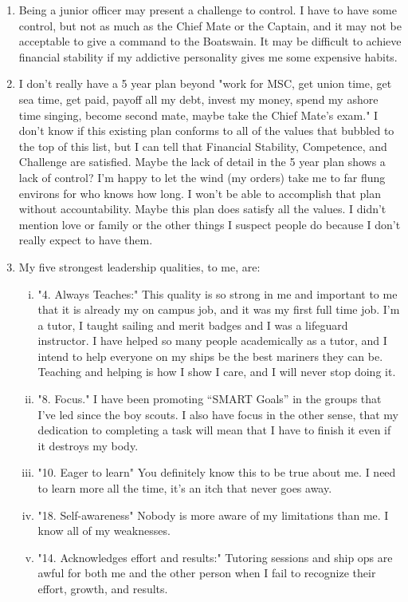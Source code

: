 \documentclass{article}[letterpaper,12pt]
\begin{document}
\begin{enumerate}
	\item Being a junior officer may present a challenge to control.
	I have to have some control, but not as much as the Chief Mate or the Captain, and it may not be acceptable to give a command to the Boatswain. It may be difficult to achieve financial stability if my addictive personality gives me some expensive habits. 
	\item I don't really have a 5 year plan beyond "work for MSC, get union time, get sea time, get paid, payoff all my debt, invest my money, spend my ashore time singing, become second mate, maybe take the Chief Mate's exam." I don't know if this existing plan conforms to all of the values that bubbled to the top of this list, but I can tell that Financial Stability, Competence, and Challenge are satisfied. Maybe the lack of detail in the 5 year plan shows a lack of control? I'm happy to let the wind (my orders) take me to far flung environs for who knows how long. I won't be able to accomplish that plan without accountability. Maybe this plan does satisfy all the values. I didn't mention love or family or the other things I suspect people do because I don't really expect to have them.
	\item My five strongest leadership qualities, to me, are:
		\begin{enumerate}[i.]
			\item "4. Always Teaches:"\parencite{peitzman_20_2022} This quality is so strong in me and important to me that it is already my on campus job, and it was my first full time job. I'm a tutor, I taught sailing and merit badges and I was a lifeguard instructor. I have helped so many people academically as a tutor, and I intend to help everyone on my ships be the best mariners they can be. Teaching and helping is how I show I care, and I will never stop doing it.
			\item "8. Focus." \parencite{wike_20_2023} I have been promoting ``SMART Goals'' in the groups that I've led since the boy scouts. I also have focus in the other sense, that my dedication to completing a task will mean that I have to finish it even if it destroys my body.
			\item "10. Eager to learn"\parencite{wike_20_2023} You definitely know this to be true about me. I need to learn more all the time, it's an itch that never goes away.
			\item "18. Self-awareness"\parencite{wike_20_2023} Nobody is more aware of my limitations than me. I know all of my weaknesses.
			\item "14. Acknowledges effort and results:"\parencite{peitzman_20_2022} Tutoring sessions and ship ops are awful for both me and the other person when I fail to recognize their effort, growth, and results.

\end{enumerate}
\end{enumerate}
\end{document}

